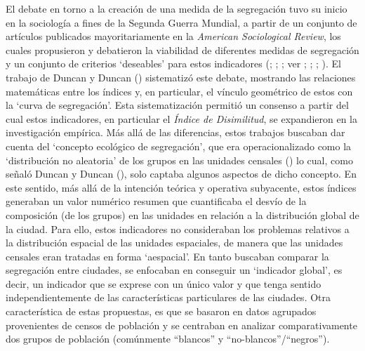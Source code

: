 \documentclass[
  spanish,
  a4paper,%
  chapterprefix=true,%
  DIV=calc,%
  twoside]{scrbook}%
\begin{document}
El debate en torno a la creación de una medida de la segregación tuvo su
inicio en la sociología a fines de la Segunda Guerra Mundial, a partir
de un conjunto de artículos publicados mayoritariamente en la \emph{American
Sociological
Review}, los
cuales propusieron y debatieron la viabilidad de diferentes medidas de
segregación y un conjunto de criterios `deseables' para estos
indicadores (; ; ; ver ; ; ; ). El trabajo de Duncan y Duncan ()
sistematizó este debate, mostrando las relaciones matemáticas entre los
índices y, en particular, el vínculo geométrico de estos con la `curva
de segregación'. Esta sistematización permitió un consenso a partir del
cual estos indicadores, en particular el \emph{Índice de Disimilitud}, se
expandieron en la investigación empírica. Más allá de las diferencias,
estos trabajos buscaban dar cuenta del `concepto ecológico de
segregación', que era operacionalizado como la `distribución no
aleatoria' de los grupos en las unidades censales () lo
cual, como señaló Duncan y Duncan (), solo captaba algunos aspectos
de dicho concepto. En este sentido, más allá de la intención teórica y
operativa subyacente, estos índices generaban un valor numérico resumen
que cuantificaba el desvío de la composición (de los grupos) en las
unidades en relación a la distribución global de la ciudad. Para ello,
estos indicadores no consideraban los problemas relativos a la
distribución espacial de las unidades espaciales, de manera que las
unidades censales eran tratadas en forma `aespacial'. En tanto buscaban
comparar la segregación entre ciudades, se enfocaban en conseguir un
`indicador global', es decir, un indicador que se exprese con un único
valor y que tenga sentido independientemente de las características
particulares de las ciudades. Otra característica de estas propuestas,
es que se basaron en datos agrupados provenientes de censos de población
y se centraban en analizar comparativamente dos grupos de población
(comúnmente ``blancos'' y ``no-blancos''/``negros'').
\end{document}
